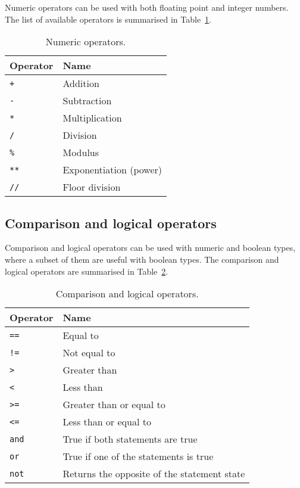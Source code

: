 \documentclass[11pt,a4paper]{article}
\begin{document}
Numeric operators can be used with both floating point and integer numbers.  The list of available operators is summarised in Table~\ref{table:numeric-operators}.
%
\begin{table}[h!!]
  \begin{center}
    \caption{Numeric operators.}
    \label{table:numeric-operators}
    \begin{tabular}{l|l} \hline
      \textbf{Operator} & \textbf{Name}\\
      \hline
      \texttt{+} & Addition\\
      \texttt{-} & Subtraction\\
      \texttt{*} & Multiplication\\
      \texttt{/} & Division\\
      \texttt{\%} & Modulus\\
      \texttt{**} & Exponentiation (power)\\
      \texttt{//} & Floor division\\ \hline
    \end{tabular}
  \end{center}
\end{table}

\subsection{Comparison and logical operators \label{section:logical-operators}}

Comparison and logical operators can be used with numeric and boolean types, where a subset of them are useful with boolean types.  The comparison and logical operators are summarised in Table~\ref{table:logical-operators}.
%
\begin{table}[h!!]
  \begin{center}
    \caption{Comparison and logical operators.}
    \label{table:logical-operators}
    \begin{tabular}{l|l} \hline
      \textbf{Operator} & \textbf{Name}\\
      \hline
      \texttt{==} & Equal to\\
      \texttt{!=} & Not equal to\\
      \texttt{>} & Greater than\\
      \texttt{<} & Less than\\
      \texttt{>=} & Greater than or equal to\\
      \texttt{<=} & Less than or equal to\\
      \texttt{and} & True if both statements are true\\
      \texttt{or} & True if one of the statements is true\\
      \texttt{not} & Returns the opposite of the statement state\\ \hline
    \end{tabular}
  \end{center}
\end{table}
\end{document}
